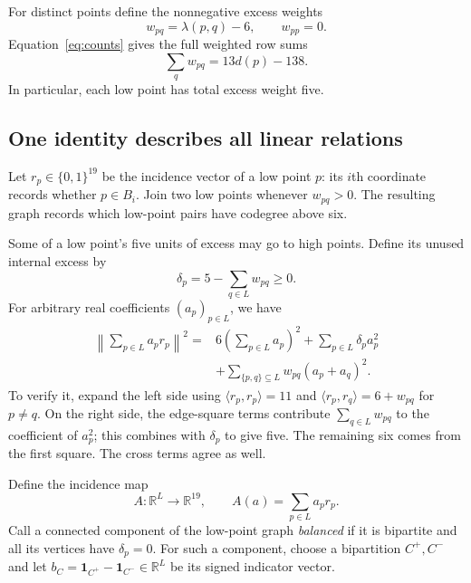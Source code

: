 \documentclass[11pt,letterpaper]{article}
\theoremstyle{definition}\newtheorem{definition}[theorem]{Definition}
\theoremstyle{remark}\newtheorem{remark}[theorem]{Remark}
\newcommand{\RR}{\mathbb R}
\newcommand{\one}{\mathbf 1}
\newcommand{\lam}{\lambda}
\begin{document}
For distinct points define the nonnegative excess weights
\[
 w_{pq}=\lam(p,q)-6,\qquad w_{pp}=0.
\]
Equation~\eqref{eq:counts} gives the full weighted row sums
\begin{equation}\label{eq:excess-row}
 \sum_qw_{pq}=13d(p)-138.
\end{equation}
In particular, each low point has total excess weight five.

\subsection{One identity describes all linear relations}
Let $r_p\in\{0,1\}^{19}$ be the incidence vector of a low point $p$: its $i$th coordinate records whether $p\in B_i$. Join two low points whenever $w_{pq}>0$. The resulting graph records which low-point pairs have codegree above six.

Some of a low point's five units of excess may go to high points. Define its unused internal excess by
\[
 \delta_p=5-\sum_{q\in L}w_{pq}\ge0.
\]
For arbitrary real coefficients $(a_p)_{p\in L}$, we have
\begin{equation}\label{eq:incidence-identity}
\boxed{\begin{aligned}
 \left\|\sum_{p\in L}a_pr_p\right\|^2
 ={}&6\left(\sum_{p\in L}a_p\right)^2
       +\sum_{p\in L}\delta_pa_p^2\\
 &+\sum_{\{p,q\}\subseteq L}w_{pq}(a_p+a_q)^2.
\end{aligned}}
\end{equation}
To verify it, expand the left side using $\langle r_p,r_p\rangle=11$ and $\langle r_p,r_q\rangle=6+w_{pq}$ for $p\ne q$. On the right side, the edge-square terms contribute $\sum_{q\in L}w_{pq}$ to the coefficient of $a_p^2$; this combines with $\delta_p$ to give five. The remaining six comes from the first square. The cross terms agree as well.

Define the incidence map
\[
 A:\RR^L\longrightarrow\RR^{19},\qquad
 A(a)=\sum_{p\in L}a_pr_p.
\]
Call a connected component of the low-point graph \emph{balanced} if it is bipartite and all its vertices have $\delta_p=0$. For such a component, choose a bipartition $C^+,C^-$ and let $b_C=\one_{C^+}-\one_{C^-}\in\RR^L$ be its signed indicator vector.
\end{document}
